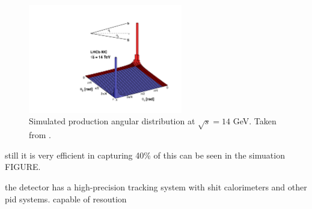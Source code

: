 \begin{figure}[!htb]
    \centering
    \includegraphics[width=0.6\textwidth]{./figs-detector/14_rad_acc_scheme_right.pdf}
    \caption{
        Simulated \bbbar production angular distribution at $\sqrt{s} = 14$ GeV.
        Taken from \cite{LHCb_bb_prod_angle}.
    }
    \label{fig:bbbar-prod-angular}
\end{figure}

still it is very efficient in capturing 40\% of \bbbar
this can be seen in the simuation FIGURE.

the detector has a high-precision tracking system with shit calorimeters and
other pid systems.
capable of resoution
